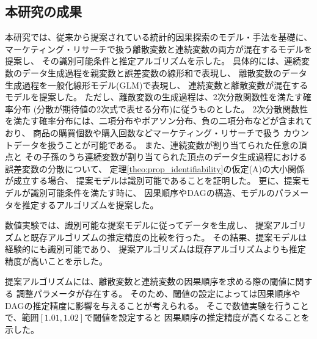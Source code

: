 
\subsection{本研究の成果}

本研究では、従来から提案されている統計的因果探索のモデル・手法を基礎に、
マーケティング・リサーチで扱う離散変数と連続変数の両方が混在するモデルを提案し、
その識別可能条件と推定アルゴリズムを示した。
具体的には、連続変数のデータ生成過程を親変数と誤差変数の線形和で表現し、
離散変数のデータ生成過程を一般化線形モデル(GLM)で表現し、
連続変数と離散変数が混在するモデルを提案した。
ただし、離散変数の生成過程は、2次分散関数性を満たす確率分布
(分散が期待値の2次式で表せる分布)に従うものとした。
2次分散関数性を満たす確率分布には、二項分布やポアソン分布、負の二項分布などが含まれており、
商品の購買個数や購入回数などマーケティング・リサーチで扱う
カウントデータを扱うことが可能である。
また、連続変数が割り当てられた任意の頂点と
その子孫のうち連続変数が割り当てられた頂点のデータ生成過程における誤差変数の分散について、
定理\ref{theo:prop_identifiability}の仮定(A)の大小関係が成立する場合、
提案モデルは識別可能であることを証明した。
更に、提案モデルが識別可能条件を満たす時に、
因果順序やDAGの構造、モデルのパラメータを推定するアルゴリズムを提案した。

数値実験では、識別可能な提案モデルに従ってデータを生成し、
提案アルゴリズムと既存アルゴリズムの推定精度の比較を行った。
その結果、提案モデルは経験的にも識別可能であり、
提案アルゴリズムは既存アルゴリズムよりも推定精度が高いことを示した。

提案アルゴリズムには、離散変数と連続変数の因果順序を求める際の閾値に関する
調整パラメータが存在する。
そのため、閾値の設定によっては因果順序やDAGの推定精度に影響を与えることが考えられる。
そこで数値実験を行うことで、範囲$[1.01, 1.02]$で閾値を設定すると
因果順序の推定精度が高くなることを示した。
